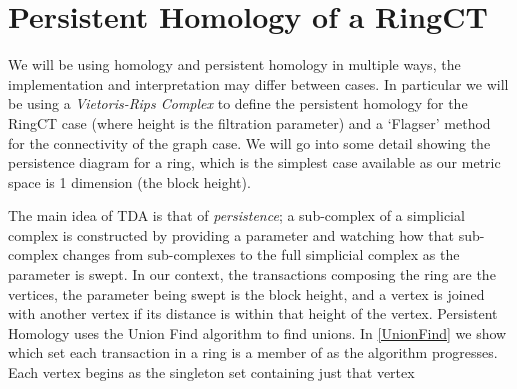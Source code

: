 \section{Persistent Homology of a RingCT}

We will be using homology and persistent homology in multiple ways, the implementation and interpretation may differ between cases.  In particular we will be using a \textit{Vietoris-Rips Complex} to define the persistent homology for the RingCT case (where height is the filtration parameter) and a `Flagser' method for the connectivity of the graph case.  We will go into some detail showing the persistence diagram for a ring, which is the simplest case available as our metric space is 1 dimension (the block height).  

The main idea of TDA is that of \textit{persistence};  a sub-complex of a simplicial complex is constructed by providing a parameter and watching how that sub-complex changes from sub-complexes to the full simplicial complex as the parameter is swept.  In our context, the transactions composing the ring are the vertices, the parameter being swept is the block height, and a vertex is joined with another vertex if its distance is within that height of the vertex.  Persistent Homology uses the Union Find algorithm to find unions.  In \ref{UnionFind} we show which set each transaction in a ring is a member of as the algorithm progresses.  Each vertex begins as the singleton set containing just that vertex

